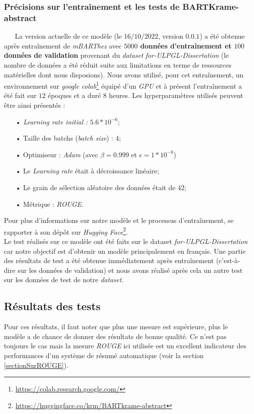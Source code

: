 \subsubsection{Précisions sur l'entraînement et les tests de BARTKrame-abstract}
$ _{} $ $ _{} $ $ _{} $ $ _{} $ $ _{} $La version actuelle de ce modèle (le $ 16/10/2022 $, version $ 0.0.1 $) a été obtenue après entraînement de \textit{mBARThez} avec \textbf{$  5000 $ données d'entraînement et $ 100 $ données de validation} provenant du \textit{dataset} \textit{for-ULPGL-Dissertation} (le nombre de données a été réduit suite aux limitations en terme de ressources matérielles dont nous disposions). Nous avons utilisé, pour cet entraînement, un environnement sur \textit{google colab}\footnote{\href{https://colab.research.google.com/}{https://colab.research.google.com/}} équipé d'un \textit{GPU} et à présent l'entraînement a été fait sur $ 12 $ époques et a duré $ 8 $ heures. Les hy\-per\-pa\-ra\-mè\-tres utilisés peuvent être ainsi présentés :
\begin{itemize}
\item[•] \textit{Learning rate initial :} $ 5.6*10^{-6} $;
\item[•] Taille des batchs (\textit{batch size}) : 4;
\item[•] Optimiseur : \textit{Adam} (avec $ \beta = 0.999 $ et $ \epsilon = 1*10^{-8} $)
\item[•] Le \textit{Learning rate} était à décroissance linéaire;
\item[•] Le grain de sélection aléatoire des données était de $ 42 $;
\item[•] Métrique : \textit{ROUGE}.
\end{itemize}
Pour plus d'informations sur notre modèle et le processus d'entraînement, se rapporter à son dépôt sur \textit{Hugging Face}\footnote{\href{https://huggingface.co/krm/BARTkrame-abstract}{https://huggingface.co/krm/BARTkrame-abstract}}.\\
Le test réalisés sur ce modèle ont été faits sur le dataset \textit{for-ULPGL-Dissertation} car notre objectif est d'obtenir un modèle principalement en français. Une partie des résultats de test a été obtenue immédiatement après entraînement (c'est-à-dire sur les données de validation) et nous avons réalisé après cela un autre test sur les données de test de notre \textit{dataset}.

\subsection{Résultats des tests}
Pour ces résultats, il faut noter que plus une mesure est supérieure, plus le modèle a de chance de donner des résultats de bonne qualité. Ce n'est pas toujours le cas mais la mesure \textit{ROUGE} ici utilisée est un excellent indicateur des performances d'un système de résumé automatique (voir la section \ref{sectionSurROUGE}).
